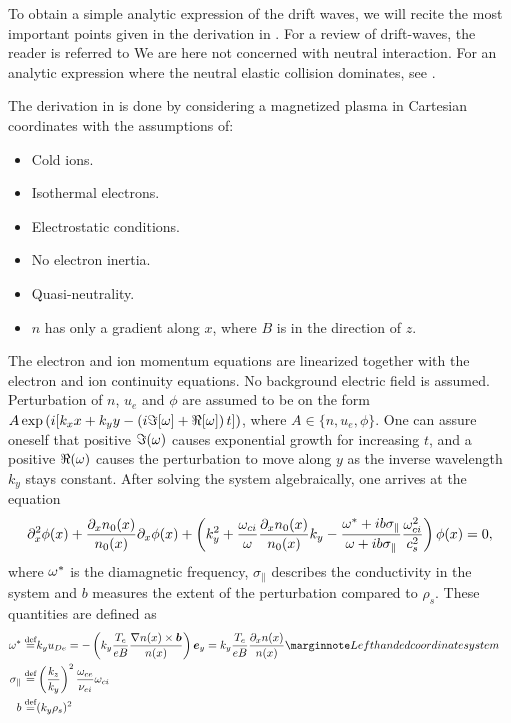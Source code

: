 To obtain a simple analytic expression of the drift waves, we will recite the most important points given in the derivation in \cite{Pecseli2016book}.
For a review of drift-waves, the reader is referred to \cite{Horton1999}
We are here not concerned with neutral interaction.
For an analytic expression where the neutral elastic collision dominates, see \cite{Ellis1980}.

The derivation in \cite{Pecseli2016book} is done by considering a magnetized plasma in Cartesian coordinates with the assumptions of:
%
\begin{itemize}[noitemsep]
    \item Cold ions.
    \item Isothermal electrons.
    \item Electrostatic conditions.
    \item No electron inertia.
    \item Quasi-neutrality.
    \item $n$ has only a gradient along $x$, where $B$ is in the direction of $z$.
\end{itemize}
%
The electron and ion momentum equations are linearized together with the electron and ion continuity equations.
No background electric field is assumed.
Perturbation of $n$, $u_e$ and $\phi$ are assumed to be on the form $A\exp\left(i[k_x x + k_y y - \left(i\Im[\omega] + \Re[\omega]\right) t]\right)$, where $A \in \{n, u_e, \phi\}$.
One can assure oneself that positive $\Im(\omega)$ causes exponential growth for increasing $t$, and a positive $\Re(\omega)$ causes the perturbation to move along $y$ as the inverse wavelength $k_y$ stays constant.
After solving the system algebraically, one arrives at the equation
%
\begin{align}
    \partial_x^2 \phi(x) +
    \frac{\partial_x n_0(x)}{n_0(x)}\partial_x \phi(x)+
    \left(k_y^2 +
    \frac{\omega_{ci}}{\omega}\frac{\partial_x n_0(x)}{n_0(x)}k_y -
    \frac{\omega^*+ib\sigma_\|}{\omega+ib\sigma_\|}\frac{\omega_{ci}^2}{c_s^2}
    \right)\phi(x)
    =0,
    \label{eq:fullDisp}
\end{align}
%
where $\omega^*$ is the diamagnetic frequency, $\sigma_\|$ describes the conductivity in the system and $b$ measures the extent of the perturbation compared to $\rho_s$.
These quantities are defined as
%
\begin{align*}
    \om^* \defined& k_y u_{De} =
    -\L(k_y \frac{T_e}{eB}\frac{\grad n(x)\times \ve{b}}{n(x)}\R)\ve{e}_y
    =
    k_y \frac{T_e}{eB}\frac{\partial_x n(x)}{n(x)}
    \note{Left handed coordinate system}
    \\
    \sigma_\| \defined& \L(\frac{k_z}{k_y}\R)^2 \frac{\om_{ce}}{\nu_{ei}}\om_{ci}\\
    b \defined& (k_y \rho_s)^2&
\end{align*}
